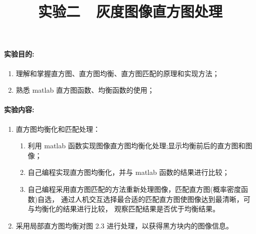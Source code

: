 \documentclass{ctexart}
\begin{document}
\title{\textbf{实验二~~灰度图像直方图处理}}
\date{}
\maketitle

\paragraph{实验目的:}
\begin{enumerate}
\item 理解和掌握直方图、直方图均衡、直方图匹配的原理和实现方法；
\item 熟悉 matlab 直方图函数、均衡函数的使用；
\end{enumerate}

\paragraph{实验内容:} 
\begin{enumerate}
\item 直方图均衡化和匹配处理：
\begin{enumerate}
\item 利用 matlab 函数实现图像直方图均衡化处理;显示均衡前后的直方图和图像；
\item 自己编程实现直方图均衡化，并与 matlab 函数的结果进行比较；
\item 自己编程采用直方图匹配的方法重新处理图像，匹配直方图(概率密度函数)自选，
    通过人机交互选择最合适的匹配直方图使图像达到最清晰，可与均衡化的结果进行比较，
    观察匹配结果是否优于均衡结果。
\end{enumerate}
\item 采用局部直方图均衡对图 2.3 进行处理，以获得黑方块内的图像信息。
\end{enumerate}
\end{document}
